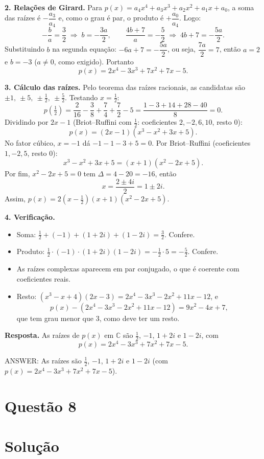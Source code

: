 \documentclass{article}%
\begin{document}
\textbf{2. Relações de Girard.} Para $p(x)=a_4x^4+a_3x^3+a_2x^2+a_1x+a_0$, a soma das raízes é $-\dfrac{a_3}{a_4}$ e, como o grau é par, o produto é $+\dfrac{a_0}{a_4}$. Logo:
\[
-\frac{b}{a}=\frac{3}{2}\;\Longrightarrow\; b=-\frac{3a}{2},
\qquad
\frac{4b+7}{a}=-\frac{5}{2}\;\Longrightarrow\; 4b+7=-\frac{5a}{2}.
\]
Substituindo $b$ na segunda equação: $-6a+7=-\dfrac{5a}{2}$, ou seja, $\dfrac{7a}{2}=7$, então $a=2$ e $b=-3$ ($a\neq 0$, como exigido). Portanto
\[
p(x)=2x^4-3x^3+7x^2+7x-5 .
\]

\textbf{3. Cálculo das raízes.} Pelo teorema das raízes racionais, as candidatas são $\pm 1,\ \pm 5,\ \pm\frac{1}{2},\ \pm\frac{5}{2}$. Testando $x=\frac{1}{2}$:
\[
p\!\left(\tfrac{1}{2}\right)=\frac{2}{16}-\frac{3}{8}+\frac{7}{4}+\frac{7}{2}-5=\frac{1-3+14+28-40}{8}=0 .
\]
Dividindo por $2x-1$ (Briot--Ruffini com $\tfrac12$: coeficientes $2,-2,6,10$, resto $0$):
\[
p(x)=(2x-1)(x^3-x^2+3x+5).
\]
No fator cúbico, $x=-1$ dá $-1-1-3+5=0$. Por Briot--Ruffini (coeficientes $1,-2,5$, resto $0$):
\[
x^3-x^2+3x+5=(x+1)(x^2-2x+5).
\]
Por fim, $x^2-2x+5=0$ tem $\Delta=4-20=-16$, então
\[
x=\frac{2\pm 4i}{2}=1\pm 2i .
\]
Assim, $p(x)=2\left(x-\tfrac12\right)(x+1)(x^2-2x+5)$.

\textbf{4. Verificação.}
\begin{itemize}
\item Soma: $\tfrac12+(-1)+(1+2i)+(1-2i)=\tfrac32$. Confere.
\item Produto: $\tfrac12\cdot(-1)\cdot(1+2i)(1-2i)=-\tfrac12\cdot 5=-\tfrac52$. Confere.
\item As raízes complexas aparecem em par conjugado, o que é coerente com coeficientes reais.
\item Resto: $(x^3-x+4)(2x-3)=2x^4-3x^3-2x^2+11x-12$, e
\[
p(x)-(2x^4-3x^3-2x^2+11x-12)=9x^2-4x+7 ,
\]
que tem grau menor que $3$, como deve ter um resto.
\end{itemize}

\textbf{Resposta.} As raízes de $p(x)$ em $\mathbb{C}$ são $\tfrac12$, $-1$, $1+2i$ e $1-2i$, com
\[
p(x)=2x^4-3x^3+7x^2+7x-5 .
\]

ANSWER: As raízes são $\frac{1}{2}$, $-1$, $1+2i$ e $1-2i$ (com $p(x)=2x^4-3x^3+7x^2+7x-5$).%
\newpage%
\section*{Questão 8}

\section*{Solução}
\end{document}
